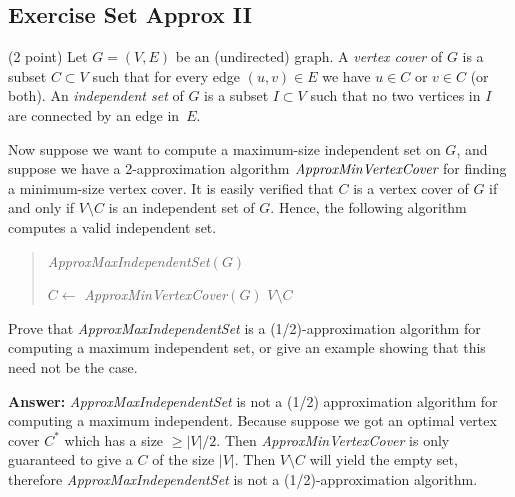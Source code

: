 \documentclass{article}
\renewcommand{\geq}{\geqslant}
\newcounter{rcounter}
\newenvironment{rlist}%
{\begin{list}{\setnr-\arabic{rcounter}}{\usecounter{rcounter}}}{\end{list}}
\begin{document}
    \subsection*{Exercise Set Approx II}
    \begin{rlist}
        \item (2 point)
        Let $G=(V,E)$ be an (undirected) graph. A \emph{vertex cover} of $G$  is a subset $C\subset V$ such that for every edge $(u,v)\in E$ we have $u\in C$ or $v\in C$ (or both). An \emph{independent set} of $G$ is a subset $I\subset V$ such that no two vertices in $I$ are connected by an edge in~$E$.
        
        Now suppose we want to compute a maximum-size independent set on $G$, and suppose we have a 2-approximation algorithm $\emph{ApproxMinVertexCover}$ for finding a minimum-size vertex cover. It is easily verified that $C$ is a vertex cover of $G$ if and only if $V\setminus C$ is an independent set of $G$. Hence, the following algorithm computes a valid independent set.
        
        \begin{algorithm}
            \vspace*{2mm}
            \begin{quotation}
                \noindent
                \emph{ApproxMaxIndependentSet}$(G)$ \\[-5mm]
                \begin{algorithmic}[1]
                    \State $C \gets$ \emph{ApproxMinVertexCover}$(G)$  
                    \State \Return $V\setminus C$
                \end{algorithmic}
            \end{quotation}
        \end{algorithm}
        
        Prove that \emph{ApproxMaxIndependentSet} is a (1/2)-approximation algorithm for computing a maximum independent set, or give an example showing that this need not be the case.
        
        \textbf{Answer:}
        \emph{ApproxMaxIndependentSet} is not a (1/2) approximation algorithm for computing a maximum independent. Because suppose we got an optimal vertex cover $C^*$ which has a size $\geq |V|/2$. Then \emph{ApproxMinVertexCover} is only guaranteed to give a $C$ of the size $|V|$. Then $V \setminus C$ will yield the empty set, therefore \emph{ApproxMaxIndependentSet} is not a (1/2)-approximation algorithm.
        

\end{rlist}
\end{document}
